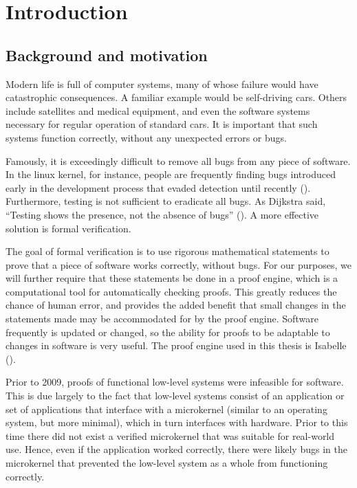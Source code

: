 \documentclass[twoside]{memoir}
\begin{document}
\tableofcontents


\mainmatter

\chapter{Introduction}

\section{Background and motivation}

Modern life is full of computer systems,
many of whose failure would have catastrophic consequences.
A familiar example would be self-driving cars.
Others include satellites and medical equipment, and even the software systems necessary for regular operation of standard cars.
It is important that such systems function correctly, without any
unexpected errors or bugs.

Famously, it is exceedingly difficult to remove all bugs
from any piece of software.
In the linux kernel, for instance, people are frequently finding bugs
introduced early in the development process that evaded detection until recently
(\cite{Amlogic2016S905}).
Furthermore, testing is not sufficient to eradicate all bugs.
As Dijkstra said, ``Testing shows the presence, not the absence of bugs''
(\cite{dijkstra-quote}).
A more effective solution is formal verification.

The goal of formal verification is to use rigorous mathematical statements
to prove that a piece of software works correctly, without bugs.
For our purposes, we will further require that these statements be
done in a proof engine, which is a computational tool for 
automatically checking proofs.
This greatly reduces the chance of human error,
and provides the added benefit that small changes in the statements made
may be accommodated for by the proof engine.
Software frequently is updated or changed, so the ability for proofs
to be adaptable to changes in software is very useful.
The proof engine used in this thesis is Isabelle (\cite{wenzel2008isabelle}).

Prior to 2009, proofs of functional low-level systems were
infeasible for software.
This is due largely to the fact that low-level systems consist of
an application or set of applications that interface with
a microkernel (similar to an operating system, but more minimal),
which in turn interfaces with hardware.
Prior to this time there did not exist a verified microkernel
that was suitable for real-world use.
Hence, even if the application worked correctly,
there were likely bugs in the microkernel that prevented the low-level system
as a whole from functioning correctly.
\end{document}
